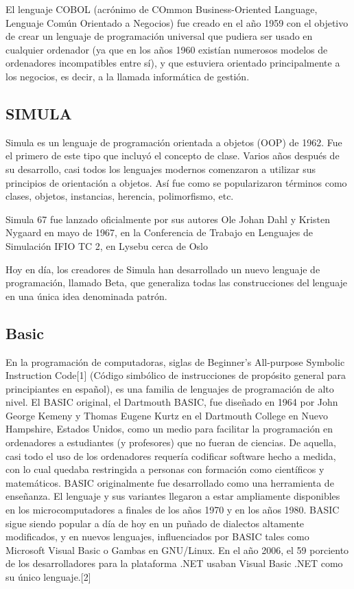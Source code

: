 \documentclass[twoside,twocolumn]{article}
\begin{document}
El lenguaje COBOL (acrónimo de COmmon Business-Oriented Language, Lenguaje Común Orientado a Negocios) fue creado en el año 1959 con el objetivo de crear un lenguaje de programación universal que pudiera ser usado en cualquier ordenador (ya que en los años 1960 existían numerosos modelos de ordenadores incompatibles entre sí), y que estuviera orientado principalmente a los negocios, es decir, a la llamada informática de gestión.

\subsection{SIMULA}

Simula es un lenguaje de programación orientada a objetos (OOP) de 1962. Fue el primero de este tipo que incluyó el concepto de clase. Varios años después de su desarrollo, casi todos los lenguajes modernos comenzaron a utilizar sus principios de orientación a objetos. Así fue como se popularizaron términos como clases, objetos, instancias, herencia, polimorfismo, etc.

Simula 67 fue lanzado oficialmente por sus autores Ole Johan Dahl y Kristen Nygaard en mayo de 1967, en la Conferencia de Trabajo en Lenguajes de Simulación IFIO TC 2, en Lysebu cerca de Oslo

Hoy en día, los creadores de Simula han desarrollado un nuevo lenguaje de programación, llamado Beta, que generaliza todas las construcciones del lenguaje en una única idea denominada patrón.

\subsection{Basic}

En la programación de computadoras, siglas de Beginner's All-purpose Symbolic Instruction Code[1] (Código simbólico de instrucciones de propósito general para principiantes en español), es una familia de lenguajes de programación de alto nivel. El BASIC original, el Dartmouth BASIC, fue diseñado en 1964 por John George Kemeny y Thomas Eugene Kurtz en el Dartmouth College en Nuevo Hampshire, Estados Unidos, como un medio para facilitar la programación en ordenadores a estudiantes (y profesores) que no fueran de ciencias. De aquella, casi todo el uso de los ordenadores requería codificar software hecho a medida, con lo cual quedaba restringida a personas con formación como científicos y matemáticos. BASIC originalmente fue desarrollado como una herramienta de enseñanza. El lenguaje y sus variantes llegaron a estar ampliamente disponibles en los microcomputadores a finales de los años 1970 y en los años 1980. BASIC sigue siendo popular a día de hoy en un puñado de dialectos altamente modificados, y en nuevos lenguajes, influenciados por BASIC tales como Microsoft Visual Basic o Gambas en GNU/Linux. En el año 2006, el 59 porciento de los desarrolladores para la plataforma .NET usaban Visual Basic .NET como su único lenguaje.[2]
\end{document}
